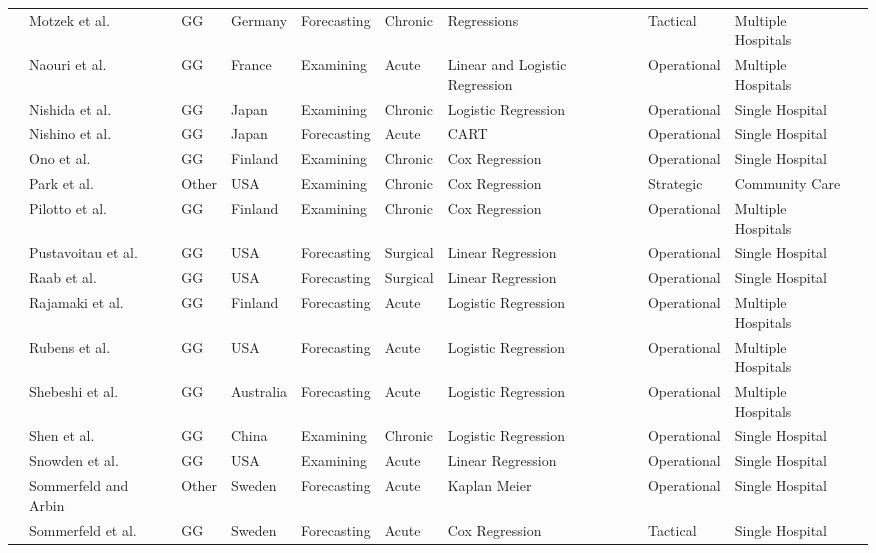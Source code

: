 \documentclass[thesis.tex]{subfiles}
\begin{document}
\begin{landscape}
\begin{table}[H]
{\begin{tabular}{@{}llllllllll@{}}
    \cite{Motzek2018} & Motzek et al. & GG & Germany & Forecasting & Chronic & Regressions & Tactical & Multiple Hospitals\\
    \cite{Naouri2022} & Naouri et al.& GG & France & Examining & Acute & Linear and Logistic Regression & Operational & Multiple Hospitals \\
    \cite{Nishida2018} & Nishida et al. & GG & Japan & Examining & Chronic & Logistic Regression & Operational & Single Hospital \\
    \cite{Nishino2019} & Nishino et al. & GG &Japan & Forecasting & Acute & CART & Operational & Single Hospital \\
    \cite{Toshiyuki2010} & Ono et al. & GG & Finland & Examining & Chronic & Cox Regression & Operational & Single Hospital \\
    \cite{Park2012} &Park et al. & Other & USA & Examining & Chronic & Cox Regression & Strategic & Community Care \\
    \cite{Pilotto2016} & Pilotto et al. & GG & Finland & Examining & Chronic & Cox Regression & Operational & Multiple Hospitals \\
   \cite{Pustavoitau2016} & Pustavoitau et al. & GG & USA & Forecasting & Surgical & Linear Regression & Operational & Single Hospital\\
    \cite{Raab2022} & Raab et al. & GG & USA & Forecasting & Surgical & Linear Regression & Operational & Single Hospital\\
    \cite{Rajamaki2020} & Rajamaki et al. & GG & Finland & Forecasting & Acute & Logistic Regression & Operational & Multiple Hospitals \\
    \cite{Rubens2022} & Rubens et al. & GG & USA &Forecasting & Acute & Logistic Regression & Operational & Multiple Hospitals\\
    \cite{Shebeshi2021} & Shebeshi et al. & GG & Australia & Forecasting & Acute & Logistic Regression & Operational & Multiple Hospitals \\
    \cite{Shen2019} & Shen et al. & GG & China & Examining & Chronic & Logistic Regression & Operational & Single Hospital \\
    \cite{Snowden2004} & Snowden et al. & GG & USA &Examining & Acute & Linear Regression & Operational & Single Hospital \\
    \cite{Sommerfeld2001}& Sommerfeld and Arbin & Other & Sweden & Forecasting & Acute & Kaplan Meier & Operational & Single Hospital \\
    \cite{Sommerfeld2011} & Sommerfeld et al. & GG & Sweden & Forecasting & Acute & Cox Regression & Tactical & Single Hospital \\

\end{tabular}}
\end{table}
\end{landscape}
\end{document}
